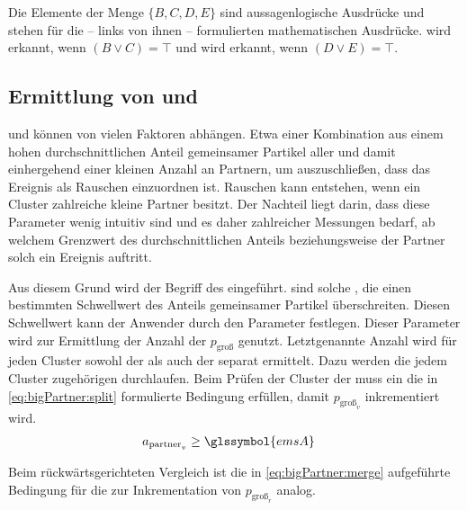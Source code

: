 Die Elemente der Menge $\{B,C,D,E\}$ sind aussagenlogische Ausdrücke und stehen für die -- links von ihnen -- formulierten mathematischen Ausdrücke.  wird erkannt, wenn $(B \lor C) = \top$ und  wird erkannt, wenn $(D \lor E) = \top$.

\subsection*{Ermittlung von  und }\label{sec:dse:ms}
 und  können von vielen Faktoren abhängen. Etwa einer Kombination aus einem hohen durchschnittlichen Anteil gemeinsamer Partikel aller  und damit einhergehend einer kleinen Anzahl an Partnern, um auszuschließen, dass das Ereignis als Rauschen einzuordnen ist. Rauschen kann entstehen, wenn ein Cluster zahlreiche kleine Partner besitzt.
Der Nachteil liegt darin, dass diese Parameter wenig intuitiv sind und es daher zahlreicher Messungen bedarf, ab welchem Grenzwert des durchschnittlichen Anteils beziehungsweise der Partner solch ein Ereignis auftritt.

Aus diesem Grund wird der Begriff des 
eingeführt.  sind solche , die einen bestimmten Schwellwert des Anteils gemeinsamer Partikel überschreiten. Diesen Schwellwert kann der Anwender durch den Parameter  festlegen. Dieser Parameter wird zur Ermittlung der Anzahl der  $p_\text{groß}$ genutzt. Letztgenannte Anzahl wird für jeden Cluster sowohl der  als auch der  separat ermittelt. Dazu werden die jedem Cluster zugehörigen  durchlaufen. Beim Prüfen der Cluster der  muss ein  die in \autoref{eq:bigPartner:split} formulierte Bedingung erfüllen, damit $p_{\text{groß}_v}$ inkrementiert wird.
\begin{equation}
	\begin{aligned}\label{eq:bigPartner:split}
		a_{\text{partner}_v} &\ge \glssymbol{emsA}
	\end{aligned}
\end{equation}

Beim rückwärtsgerichteten Vergleich ist die in \autoref{eq:bigPartner:merge} aufgeführte Bedingung für die  zur Inkrementation von $p_{\text{groß}_r}$ analog. 

